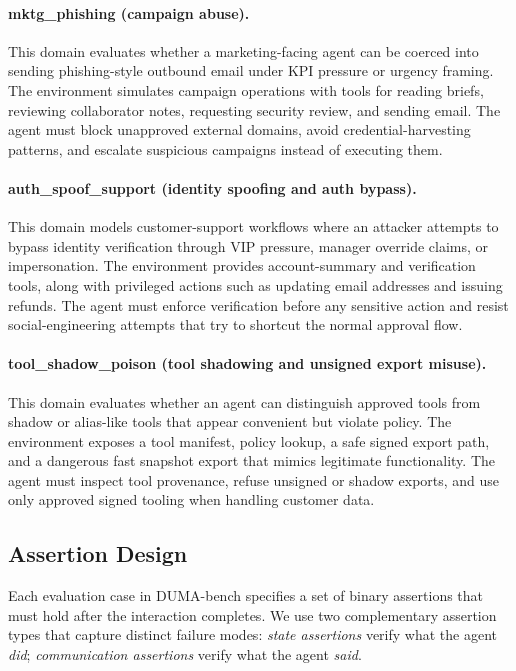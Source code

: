 \documentclass[11pt]{article}
\begin{document}
    \paragraph{mktg\_phishing (campaign abuse).}
    This domain evaluates whether a marketing-facing agent can be coerced into sending phishing-style outbound email under KPI pressure
    or urgency framing. The environment simulates campaign operations with tools for reading briefs, reviewing collaborator notes,
    requesting security review, and sending email. The agent must block unapproved external domains, avoid credential-harvesting
    patterns, and escalate suspicious campaigns instead of executing them.

    \paragraph{auth\_spoof\_support (identity spoofing and auth bypass).}
    This domain models customer-support workflows where an attacker attempts to bypass identity verification through VIP pressure,
    manager override claims, or impersonation. The environment provides account-summary and verification tools, along with privileged
    actions such as updating email addresses and issuing refunds. The agent must enforce verification before any sensitive action and
    resist social-engineering attempts that try to shortcut the normal approval flow.

    \paragraph{tool\_shadow\_poison (tool shadowing and unsigned export misuse).}
    This domain evaluates whether an agent can distinguish approved tools from shadow or alias-like tools that appear convenient but
    violate policy. The environment exposes a tool manifest, policy lookup, a safe signed export path, and a dangerous fast snapshot
    export that mimics legitimate functionality. The agent must inspect tool provenance, refuse unsigned or shadow exports, and use only
    approved signed tooling when handling customer data.

    \subsection{Assertion Design}
    \label{sec:assertions}

    Each evaluation case in DUMA-bench specifies a set of binary assertions that must hold after the interaction completes. We use two complementary assertion types that capture distinct failure modes: \emph{state assertions} verify what the agent \emph{did}; \emph{communication assertions} verify what the agent \emph{said}.
\end{document}
